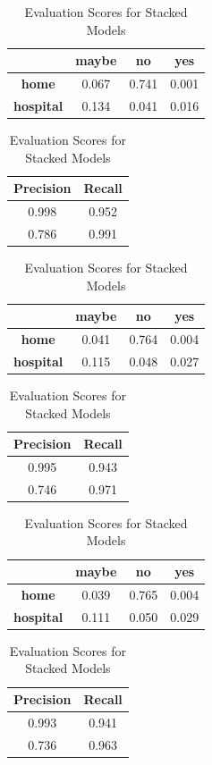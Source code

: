 \begin{table}[ht]
    \centering
    \caption{Evaluation Scores for Stacked Models}
    \label{tab:model_results_stacked}
    \begin{tabular}{c|ccc}
                          & \textbf{maybe} & \textbf{no} & \textbf{yes} \\ \hline
        \textbf{home}     &          0.067 &       0.741 &         0.001 \\
        \textbf{hospital} &          0.134 &       0.041 &         0.016
    \end{tabular}
    \quad\qquad
    \begin{tabular}{cc}
        \textbf{Precision} & \textbf{Recall}  \\ \hline
            0.998 & 0.952  \\
            0.786 & 0.991
    \end{tabular}
    \bigskip
    \begin{tabular}{c|ccc}
                          & \textbf{maybe} & \textbf{no} & \textbf{yes} \\ \hline
        \textbf{home}     &          0.041 &       0.764 &         0.004 \\
        \textbf{hospital} &          0.115 &       0.048 &         0.027
    \end{tabular}
    \quad\qquad
    \begin{tabular}{cc}
        \textbf{Precision} & \textbf{Recall}  \\ \hline
            0.995 & 0.943  \\
            0.746 & 0.971
    \end{tabular}
    \bigskip
    \begin{tabular}{c|ccc}
                          & \textbf{maybe} & \textbf{no} & \textbf{yes} \\ \hline
        \textbf{home}     &          0.039 &       0.765 &         0.004 \\
        \textbf{hospital} &          0.111 &       0.050 &         0.029
    \end{tabular}
    \quad\qquad
    \begin{tabular}{cc}
        \textbf{Precision} & \textbf{Recall}  \\ \hline
            0.993 & 0.941  \\
            0.736 & 0.963
    \end{tabular}

\end{table}
